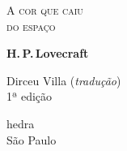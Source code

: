 




\begingroup\thispagestyle{empty}\vspace*{.05\textheight} 

              \formular
              \LARGE
              \noindent
              \textsc{A cor que caiu\\do espaço}
                      
              \bigskip  
              
              \large
              \noindent
              \textbf{H.\,P.\,Lovecraft}
              \vspace{8.5em}

              \newfontfamily{}
              {\fontsize{30}{40}\selectfont \minion\small\noindent Dirceu Villa (\textit{tradução})}\\
              \bigskip
              \noindent
              {\fontsize{30}{40}\selectfont \minion\small\noindent 1ª edição}

              \vfill
              
              \newfontfamily{}
              {\noindent\fontsize{30}{40}\selectfont \timesnewroman hedra}\\
              \smallskip
              \noindent
              {\selectfont\minion\small
              São Paulo \quad\the\year}

\endgroup
\pagebreak
